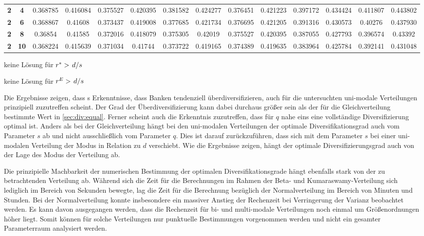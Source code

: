 \begin{sidewaystable}[!p]
\begin{threeparttable}
\begin{tabular}{>{\bfseries}c>{\bfseries}cSSSSSSSSSSSS}
			2   & 4    & 0.368785                 & 0.416084 & 0.375527   & 0.420395 & 0.381582   & 0.424277 & 0.376451                 & 0.421223                    & 0.397172   & 0.434424 & 0.411807   & 0.443802 \\
			2   & 6    & 0.368867                 & 0.41608  & 0.373437   & 0.419008 & 0.377685   & 0.421734 & 0.376695                 & 0.421205                    & 0.391316   & 0.430573 & 0.40276    & 0.437930 \\
			2   & 8    & 0.36854                  & 0.41585  & 0.372016   & 0.418079 & 0.375305   & 0.42019  & 0.375527                 & 0.420395                    & 0.387055   & 0.427793 & 0.396574   & 0.43392  \\
			2   & 10   & 0.368224                 & 0.415639 & 0.371034   & 0.41744  & 0.373722   & 0.419165 & 0.374389                 & 0.419635                    & 0.383964   & 0.425784 & 0.392141   & 0.431048 \\ \bottomrule
		\end{tabular}
		\begin{tablenotes}[para]
			\item[\textdagger] keine Lösung für $r^\ast > \flatfrac{d}{s}$
			\item[\textdaggerdbl] keine Lösung für $r^E > \flatfrac{d}{s}$
		\end{tablenotes}
	\end{threeparttable}
\end{sidewaystable}

Die Ergebnisse zeigen, dass \citeauthor{Wagner-2010}s Erkenntnisse, dass Banken tendenziell überdiversifizieren, auch für die untersuchten uni-modale Verteilungen prinzipiell zuzutreffen scheint. Der Grad der Überdiversifizierung kann dabei durchaus größer sein als der für die Gleichverteilung bestimmte Wert in \cref{sec:div:equal}. Ferner scheint auch die Erkenntnis zuzutreffen, dass für $q$ nahe eins eine vollständige Diversifizierung optimal ist. Anders als bei der Gleichverteilung hängt bei den uni-modalen Verteilungen der optimale Diversifikationsgrad auch vom Parameter $s$ ab und nicht ausschließlich vom Parameter $q$. Dies ist darauf zurückzuführen, dass sich mit dem Parameter $s$ bei einer uni-modalen Verteilung der Modus in Relation zu $d$ verschiebt. Wie die Ergebnisse zeigen, hängt der optimale Diversifizierungsgrad auch von der Lage des Modus der Verteilung ab.

Die prinzipielle Machbarkeit der numerischen Bestimmung der optimalen Diversifikationsgrade hängt ebenfalls stark von der zu betrachtenden Verteilung ab. Während sich die Zeit für die Berechnungen im Rahmen der Beta- und Kumaraswamy-Verteilung sich lediglich im Bereich von Sekunden bewegte, lag die Zeit für die Berechnung bezüglich der Normalverteilung im Bereich von Minuten und Stunden. Bei der Normalverteilung konnte insbesondere ein massiver Anstieg der Rechenzeit bei Verringerung der Varianz beobachtet werden. Es kann davon ausgegangen werden, dass die Rechenzeit für bi- und multi-modale Verteilungen noch einmal um Größenordnungen höher liegt. Somit können für solche Verteilungen nur punktuelle Bestimmungen vorgenommen werden und nicht ein gesamter Parameterraum analysiert werden.
